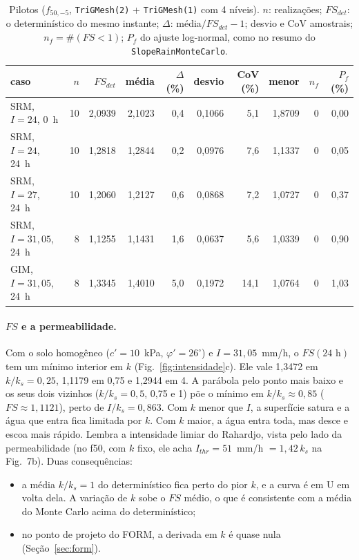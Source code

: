 \documentclass[11pt,a4paper]{article}
\begin{document}
\begin{table}[htbp]\centering\footnotesize\setlength{\tabcolsep}{3.5pt}
\caption{Pilotos ($f_{50,-5}$, \texttt{TriGMesh(2)} + \texttt{TriGMesh(1)} com 4 níveis). $n$: realizações; $FS_{det}$:
o determinístico do mesmo instante; $\Delta$: média$/FS_{det} - 1$; desvio e CoV amostrais; $n_f = \#(FS < 1)$; $P_f$
do ajuste log-normal, como no resumo do \texttt{SlopeRainMonteCarlo}.}\label{tab:pilotos}
\begin{tabular}{lrrrrrrrrr}\toprule
caso & $n$ & $FS_{det}$ & média & $\Delta$ (\%) & desvio & CoV (\%) & menor & $n_f$ & $P_f$ (\%) \\\midrule
SRM, $I = 24$, 0~h & 10 & 2,0939 & 2,1023 & 0,4 & 0,1066 & 5,1 & 1,8709 & 0 & 0,00 \\
SRM, $I = 24$, 24~h & 10 & 1,2818 & 1,2844 & 0,2 & 0,0976 & 7,6 & 1,1337 & 0 & 0,05 \\
SRM, $I = 27$, 24~h & 10 & 1,2060 & 1,2127 & 0,6 & 0,0868 & 7,2 & 1,0727 & 0 & 0,37 \\
SRM, $I = 31{,}05$, 24~h & 8 & 1,1255 & 1,1431 & 1,6 & 0,0637 & 5,6 & 1,0339 & 0 & 0,90 \\
GIM, $I = 31{,}05$, 24~h & 8 & 1,3345 & 1,4010 & 5,0 & 0,1972 & 14,1 & 1,0764 & 0 & 1,03 \\
\bottomrule\end{tabular}\end{table}

\paragraph{$FS$ e a permeabilidade.} Com o solo homogêneo ($c' = 10$~kPa, $\varphi' = 26^\circ$) e $I = 31{,}05$~mm/h, o
$FS(24\text{ h})$ tem um mínimo interior em $k$ (Fig.~\ref{fig:intensidade}c). Ele vale 1,3472 em $k/k_s = 0{,}25$,
1,1179 em 0,75 e 1,2944 em 4. A parábola pelo ponto mais baixo e os seus dois vizinhos ($k/k_s = 0{,}5$, 0,75 e 1) põe
o mínimo em $k/k_s \approx 0{,}85$ ($FS \approx 1{,}1121$), perto de $I/k_s = 0{,}863$. Com $k$ menor que $I$, a
superfície satura e a água que entra fica limitada por $k$. Com $k$ maior, a água entra toda, mas desce e escoa mais
rápido. Lembra a intensidade limiar do Rahardjo, vista pelo lado da permeabilidade (no f50, com $k$ fixo, ele acha
$I_{thr} = 51$~mm/h $= 1{,}42\,k_s$ na Fig.~7b). Duas consequências:
\begin{itemize}
\item a média $k/k_s = 1$ do determinístico fica perto do pior $k$, e a curva é em U em volta dela. A variação de $k$
sobe o $FS$ médio, o que é consistente com a média do Monte Carlo acima do determinístico;
\item no ponto de projeto do FORM, a derivada em $k$ é quase nula (Seção~\ref{sec:form}).
\end{itemize}
\end{document}
